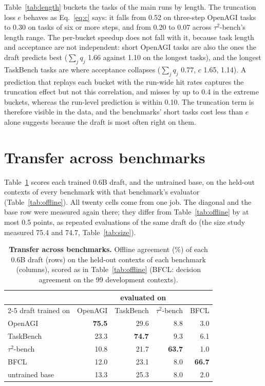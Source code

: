 Table~\ref{tab:length} buckets the tasks of the main runs by length. The truncation loss $e$ behaves as
Eq.~\ref{eq:c} says: it falls from 0.52 on three-step OpenAGI tasks to 0.30 on tasks of six or more
steps, and from 0.20 to 0.07 across $\tau^2$-bench's length range. The per-bucket speedup does not fall with
it, because task length and acceptance are not independent: short OpenAGI tasks are also the ones the
draft predicts best ($\sum_j q_j$ 1.66 against 1.10 on the longest tasks), and the longest TaskBench
tasks are where acceptance collapses ($\sum_j q_j$ 0.77, $c$ 1.65, 1.14\xx{}). A prediction that replays
each bucket with the run-wide hit rates captures the truncation effect but not this correlation, and
misses by up to 0.4 in the extreme buckets, whereas the run-level prediction is within 0.10. The
truncation term is therefore visible in the data, and the benchmarks' short tasks cost less than $e$
alone suggests because the draft is most often right on them.

\section{Transfer across benchmarks}
\label{app:transfer}
Table~\ref{tab:transfer} scores each trained 0.6B draft, and the untrained base, on the held-out contexts of
every benchmark with that benchmark's evaluator (Table~\ref{tab:offline}). All twenty cells come from one
job. The diagonal and the base row were measured again there; they differ from Table~\ref{tab:offline} by at
most 0.5 points, as repeated evaluations of the same draft do (the size study measured 75.4 and 74.7,
Table~\ref{tab:size}).

\begin{table}[h]
\centering
\caption{\textbf{Transfer across benchmarks.} Offline agreement (\%) of each 0.6B draft (rows) on the
held-out contexts of each benchmark (columns), scored as in Table~\ref{tab:offline} (BFCL: decision agreement
on the 99 development contexts).}
\label{tab:transfer}
\small
\begin{tabular}{lrrrr}
\toprule
 & \multicolumn{4}{c}{evaluated on} \\
\cmidrule(lr){2-5}
draft trained on & OpenAGI & TaskBench & $\tau^2$-bench & BFCL \\
\midrule
OpenAGI        & \textbf{75.5} & 29.6 & 8.8 & 3.0 \\
TaskBench      & 23.3 & \textbf{74.7} & 9.3 & 6.1 \\
$\tau^2$-bench & 10.8 & 21.7 & \textbf{63.7} & 1.0 \\
BFCL           & 12.0 & 23.1 & 8.0 & \textbf{66.7} \\
\midrule
untrained base & 13.3 & 25.3 & 8.0 & 2.0 \\
\bottomrule
\end{tabular}
\end{table}

